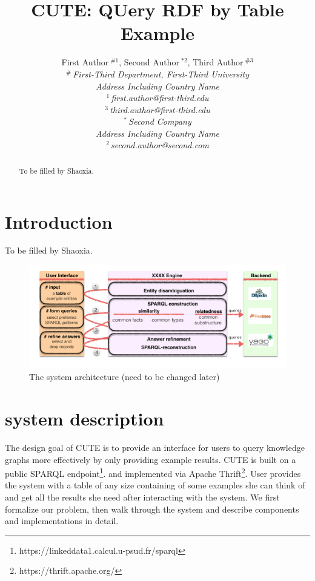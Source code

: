 \documentclass[10pt,conference,letterpaper]{IEEEtran}
\title{CUTE: QUery RDF by Table Example}
\author{%
{First Author{\small $~^{\#1}$}, Second Author{\small $~^{*2}$}, Third Author{\small $~^{\#3}$} }%
\vspace{1.6mm}\\
\fontsize{10}{10}\selectfont\itshape
$^{\#}$\,First-Third Department, First-Third University\\
Address Including Country Name\\
\fontsize{9}{9}\selectfont\ttfamily\upshape
%
$^{1}$\,first.author@first-third.edu\\
$^{3}$\,third.author@first-third.edu%
\vspace{1.2mm}\\
\fontsize{10}{10}\selectfont\rmfamily\itshape
$^{*}$\,Second Company\\
Address Including Country Name\\
\fontsize{9}{9}\selectfont\ttfamily\upshape
$^{2}$\,second.author@second.com
}
\newcommand{\res}{CUTE }
\begin{document}
\maketitle
%




\begin{abstract} 
To be filled by Shaoxia.
\end{abstract}

%
\section{Introduction}
%
To be filled by Shaoxia.



\newpage

\null\newpage

\begin{figure}
\centering
	\includegraphics[scale=0.6]{figure/pipeline2}
	\caption{The system architecture (need to be changed  later)}
	\label{pipe}
\end{figure}

\section{system description}

The design goal of \res is to provide an interface for users to query knowledge graphs more effectively by only providing example results. \res is built on a public SPARQL endpoint\footnote{https://linkeddata1.calcul.u-psud.fr/sparql}. and implemented via Apache Thrift\footnote{https://thrift.apache.org/}. User provides the system with a table of any size containing of some examples she can think of and get all the results she need after interacting with the system. We first formalize our problem, then walk through the system and describe components and implementations in detail.
\end{document}
